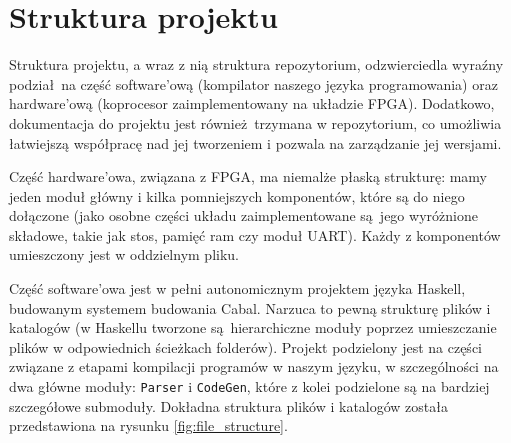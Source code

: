 \section{Struktura projektu}

Struktura projektu, a wraz z nią struktura repozytorium, odzwierciedla wyraźny podział na część software'ową (kompilator naszego języka programowania) oraz hardware'ową (koprocesor zaimplementowany na układzie FPGA). Dodatkowo, dokumentacja do projektu jest również trzymana w repozytorium, co umożliwia łatwiejszą współpracę nad jej tworzeniem i pozwala na zarządzanie jej wersjami.

Część hardware'owa, związana z FPGA, ma niemalże płaską strukturę: mamy jeden moduł główny i kilka pomniejszych komponentów, które są do niego dołączone (jako osobne części układu zaimplementowane są jego wyróżnione składowe, takie jak stos, pamięć ram czy moduł UART). Każdy z komponentów umieszczony jest w oddzielnym pliku.

Część software'owa jest w pełni autonomicznym projektem języka Haskell, budowanym systemem budowania Cabal. Narzuca to pewną strukturę plików i katalogów (w Haskellu tworzone są hierarchiczne moduły poprzez umieszczanie plików w odpowiednich ścieżkach folderów). Projekt podzielony jest na części związane z etapami kompilacji programów w naszym języku, w szczególności na dwa główne moduły: \texttt{Parser} i \texttt{CodeGen}, które z kolei podzielone są na bardziej szczegółowe submoduły. Dokładna struktura plików i katalogów została przedstawiona na rysunku \ref{fig:file_structure}.

